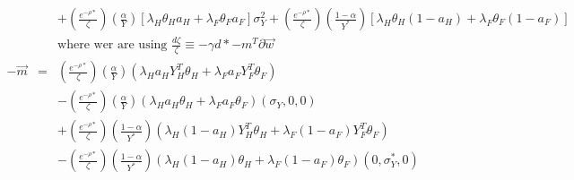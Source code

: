 \documentclass[]{article}
\begin{document}
\begin{eqnarray*}
&& + \left(\frac{e^{-\rho *}}{\zeta}\right)\left(\frac{\alpha}{Y}\right) \left[\lambda_H \theta_H a_H + \lambda_F \theta_F a_F \right]\sigma_Y^2 + \left(\frac{e^{-\rho *}}{\zeta}\right)\left(\frac{1-\alpha}{Y^*}\right) \left[\lambda_H \theta_H (1-a_H) + \lambda_F \theta_F (1-a_F) \right]\\
&& \mbox{where wer are using } \frac{d\zeta}{\zeta} \equiv -\gamma d* - m^T \partial \vec{w}\\
-\vec{m} &=& \left(\frac{e^{-\rho *}}{\zeta}\right)\left(\frac{\alpha}{Y}\right) \left(\lambda_H a_H Y_H^T \theta_H + \lambda_F a_F Y_F^T\theta_F\right)\\
&& - \left(\frac{e^{-\rho *}}{\zeta}\right)\left(\frac{\alpha}{Y}\right) \left(\lambda_H a_H \theta_H + \lambda_F a_F \theta_F\right) \left(\sigma_Y ,0,0\right)\\
&& + \left(\frac{e^{-\rho *}}{\zeta}\right)\left(\frac{1-\alpha}{Y^*}\right) \left(\lambda_H (1-a_H) Y_H^T \theta_H + \lambda_F (1-a_F) Y_F^T\theta_F\right)\\
&& - \left(\frac{e^{-\rho *}}{\zeta}\right)\left(\frac{1-\alpha}{Y^*}\right) \left(\lambda_H (1-a_H) \theta_H + \lambda_F (1-a_F) \theta_F\right) \left(0,\sigma_Y^* ,0\right)\\
\end{eqnarray*}
\end{document}
